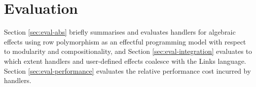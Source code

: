 \chapter{Evaluation}\label{ch:evaluation}
Section \ref{sec:eval-abs} briefly summarises and evaluates handlers for algebraic effects using row polymorphism as an effectful programming model with respect to modularity and compositionality, and Section \ref{sec:eval-integration} evaluates to which extent handlers and user-defined effects coalesce with the Links language. Section \ref{sec:eval-performance} evaluates the relative performance cost incurred by handlers.